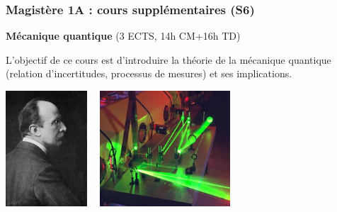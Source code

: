 \documentclass[slidetop,11pt]{beamer}
\begin{document}
\begin{frame}
\frametitle{Magistère 1A : cours supplémentaires (S6)}

\textbf{Mécanique quantique} (3 ECTS, 14h CM+16h TD)

L'objectif de ce cours est d'introduire la théorie de la mécanique quantique (relation d'incertitudes, processus de mesures) et ses implications.
\begin{center}
\includegraphics[height=4.3cm]{Max_Planck_Nobel_1918.jpg}$\quad$
\includegraphics[height=4.3cm]{Laser_optique.jpg}
\end{center}
\end{frame}
\end{document}
